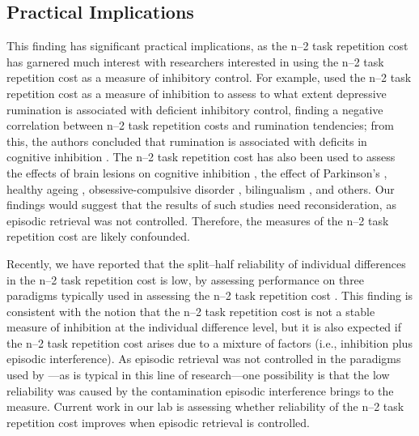 \documentclass[a4paper, doc, natbib]{apa6}
\begin{document}
\subsection{Practical Implications}
This finding has significant practical implications, as the n--2 task repetition cost has garnered much interest with researchers interested in using the n--2 task repetition cost as a measure of inhibitory control. For example, \cite{Whitmer2007} used the n--2 task repetition cost as a measure of inhibition to assess to what extent depressive rumination is associated with deficient inhibitory control, finding a negative correlation between n--2 task repetition costs and rumination tendencies; from this, the authors concluded that rumination is associated with deficits in cognitive inhibition \citep[see also][]{Whitmer2012}. The n--2 task repetition cost has also been used to assess the effects of brain lesions on cognitive inhibition \citep{Mayr2006}, the effect of Parkinson's \citep{Fales2006}, healthy ageing \citep{Lawo2012}, obsessive-compulsive disorder \citep{Moritz2004}, bilingualism \citep{Prior2012}, and others. Our findings would suggest that the results of such studies need reconsideration, as episodic retrieval was not controlled. Therefore, the measures of the n--2 task repetition cost are likely confounded.

Recently, we have reported that the split--half reliability of individual differences in the n--2 task repetition cost is low, by assessing performance on three paradigms typically used in assessing the n--2 task repetition cost \citep{Kowalczykinpress}. This finding is consistent with the notion that the n--2 task repetition cost is not a stable measure of inhibition at the individual difference level, but it is also expected if the n--2 task repetition cost arises due to a mixture of factors (i.e., inhibition plus episodic interference). As episodic retrieval was not controlled in the paradigms used by \cite{Kowalczykinpress}---as is typical in this line of research---one possibility is that the low reliability was caused by the contamination episodic interference brings to the measure. Current work in our lab is assessing whether reliability of the n--2 task repetition cost improves when episodic retrieval is controlled.
\end{document}
